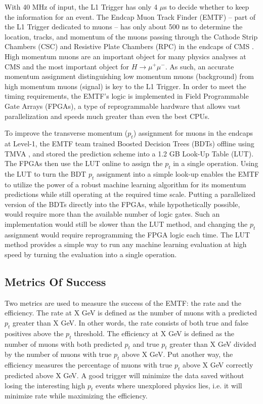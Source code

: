 With 40 MHz of input, the L1 Trigger has only 4 $\mu$s to decide whether to keep the information for an event. The Endcap Muon Track Finder (EMTF) -- part of the L1 Trigger dedicated to muons -- has only about 500 ns to determine the location, tracks, and momentum of the muons passing through the Cathode Strip Chambers (CSC) and Resistive Plate Chambers (RPC) in the endcaps of CMS \cite{Tapper:1556311}. High momentum muons are an important object for many physics analyses at CMS and the most important object for $H\rightarrow\mu^+\mu^-$. As such, an accurate momentum assignment distinguishing low momentum muons (background) from high momentum muons (signal) is key to the L1 Trigger. In order to meet the timing requirements, the EMTF's logic is implemented in Field Programmable Gate Arrays (FPGAs), a type of reprogrammable hardware that allows vast parallelization and speeds much greater than even the best CPUs.

To improve the transverse momentum ($p_t$) assignment for muons in the endcaps at Level-1, the EMTF team trained Boosted Decision Trees (BDTs) offline using TMVA \cite{Hocker:2007ht}, and stored the prediction scheme into a 1.2 GB Look-Up Table (LUT). The FPGAs then use the LUT online to assign the $p_t$ in a single operation. Using the LUT to turn the BDT $p_t$ assignment into a simple look-up enables the EMTF to utilize the power of a robust machine learning algorithm for its momentum predictions while still operating at the required time scale. Putting a parallelized version of the BDTs directly into the FPGAs, while hypothetically possible, would require more than the available number of logic gates. Such an implementation would still be slower than the LUT method, and changing the $p_t$ assignment would require reprogramming the FPGA logic each time. The LUT method provides a simple way to run any machine learning evaluation at high speed by turning the evaluation into a single operation.

\subsection{Metrics Of Success}

Two metrics are used to measure the success of the EMTF: the rate and the efficiency. The rate at X GeV is defined as the number of muons with a predicted $p_t$ greater than X GeV. In other words, the rate consists of both true and false positives above the $p_t$ threshold. The efficiency at X GeV is defined as the number of muons with both predicted $p_t$ and true $p_t$ greater than X GeV divided by the number of muons with true $p_t$ above X GeV. Put another way, the efficiency measures the percentage of muons with true $p_t$ above X GeV correctly predicted above X GeV. A good trigger will minimize the data saved without losing the interesting high $p_t$ events where unexplored physics lies, i.e. it will minimize rate while maximizing the efficiency.

